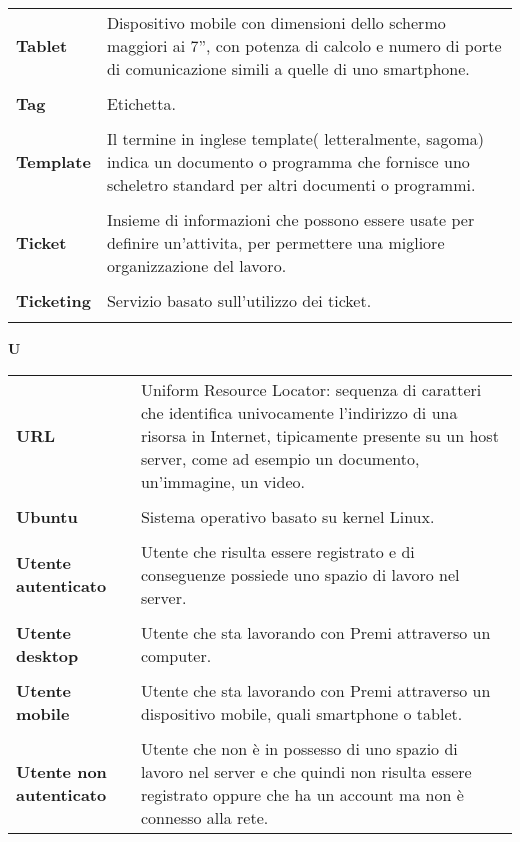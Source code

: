 {\normalsize 
\begin{longtable}{L{4cm} p{10cm}}
\textbf{Tablet} & Dispositivo mobile con dimensioni dello schermo maggiori ai 7”, con potenza di calcolo e numero di porte di comunicazione simili a quelle di uno smartphone. \\ 
 \\ 
\textbf{Tag} & Etichetta. \\ 
 \\ 
\textbf{Template} & Il termine in inglese template( letteralmente, sagoma) indica un documento o programma che fornisce uno scheletro standard per altri documenti o programmi. \\ 
 \\ 
\textbf{Ticket} & Insieme di informazioni che possono essere usate per definire un’attivita, per permettere una migliore organizzazione del lavoro. \\ 
 \\ 
\textbf{Ticketing} & Servizio basato sull’utilizzo dei ticket. \\ 
 \\ 
\end{longtable} 
\newpage 
{} 
{} 
\hfill\Huge{\textbf{U}} \\ 
\normalsize 
\begin{longtable}{L{4cm} p{10cm}}
\textbf{URL} & Uniform Resource Locator: sequenza di caratteri che identifica univocamente l'indirizzo di una risorsa in Internet, tipicamente presente su un host server, come ad esempio un documento, un'immagine, un video. \\ 
 \\ 
\textbf{Ubuntu} & Sistema operativo basato su kernel Linux. \\ 
 \\ 
\textbf{Utente autenticato} & Utente che risulta essere registrato e di conseguenze possiede uno spazio di lavoro nel server. \\ 
 \\ 
\textbf{Utente desktop} & Utente che sta lavorando con Premi attraverso un computer. \\ 
 \\ 
\textbf{Utente mobile} & Utente che sta lavorando con Premi attraverso un dispositivo mobile, quali smartphone o tablet. \\ 
 \\ 
\textbf{Utente non autenticato} & Utente che non è in possesso di uno spazio di lavoro nel server e che quindi non risulta essere registrato oppure che ha un account ma non è connesso alla rete. \\ 

\end{longtable}}
